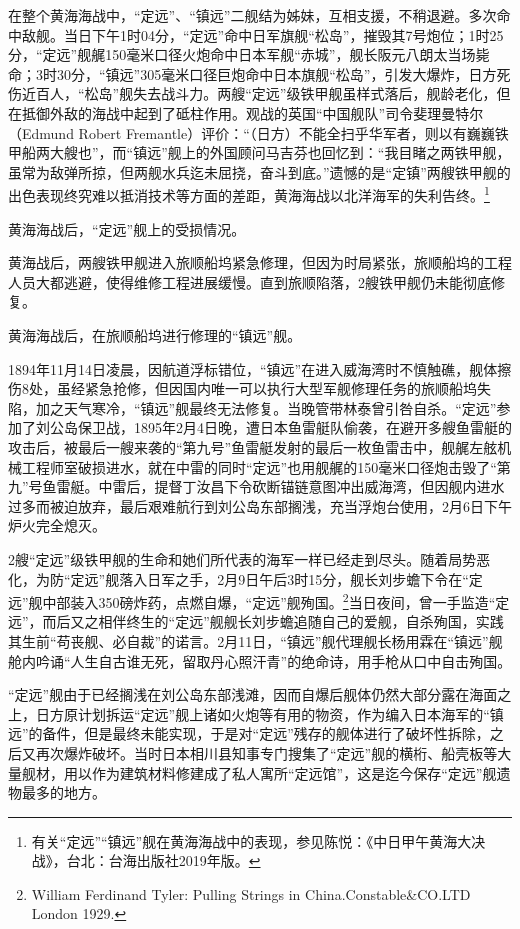 \documentclass[12pt,UTF8]{ctexbook}
\begin{document}
在整个黄海海战中，“定远”、“镇远”二舰结为姊妹，互相支援，不稍退避。多次命中敌舰。当日下午1时04分，“定远”命中日军旗舰“松岛”，摧毁其7号炮位；1时25分，“定远”舰艉150毫米口径火炮命中日本军舰“赤城”，舰长阪元八朗太当场毙命；3时30分，“镇远”305毫米口径巨炮命中日本旗舰“松岛”，引发大爆炸，日方死伤近百人，“松岛”舰失去战斗力。两艘“定远”级铁甲舰虽样式落后，舰龄老化，但在抵御外敌的海战中起到了砥柱作用。观战的英国“中国舰队”司令斐理曼特尔（Edmund Robert Fremantle）评价：“（日方）不能全扫乎华军者，则以有巍巍铁甲船两大艘也”，而“镇远”舰上的外国顾问马吉芬也回忆到：“我目睹之两铁甲舰，虽常为敌弹所掠，但两舰水兵迄未屈挠，奋斗到底。”遗憾的是“定镇”两艘铁甲舰的出色表现终究难以抵消技术等方面的差距，黄海海战以北洋海军的失利告终。\footnote{有关“定远”“镇远”舰在黄海海战中的表现，参见陈悦：《中日甲午黄海大决战》，台北：台海出版社2019年版。}

黄海海战后，“定远”舰上的受损情况。

黄海战后，两艘铁甲舰进入旅顺船坞紧急修理，但因为时局紧张，旅顺船坞的工程人员大都逃避，使得维修工程进展缓慢。直到旅顺陷落，2艘铁甲舰仍未能彻底修复。

黄海海战后，在旅顺船坞进行修理的“镇远”舰。

1894年11月14日凌晨，因航道浮标错位，“镇远”在进入威海湾时不慎触礁，舰体擦伤8处，虽经紧急抢修，但因国内唯一可以执行大型军舰修理任务的旅顺船坞失陷，加之天气寒冷，“镇远”舰最终无法修复。当晚管带林泰曾引咎自杀。“定远”参加了刘公岛保卫战，1895年2月4日晚，遭日本鱼雷艇队偷袭，在避开多艘鱼雷艇的攻击后，被最后一艘来袭的“第九号”鱼雷艇发射的最后一枚鱼雷击中，舰艉左舷机械工程师室破损进水，就在中雷的同时“定远”也用舰艉的150毫米口径炮击毁了“第九”号鱼雷艇。中雷后，提督丁汝昌下令砍断锚链意图冲出威海湾，但因舰内进水过多而被迫放弃，最后艰难航行到刘公岛东部搁浅，充当浮炮台使用，2月6日下午炉火完全熄灭。

2艘“定远”级铁甲舰的生命和她们所代表的海军一样已经走到尽头。随着局势恶化，为防“定远”舰落入日军之手，2月9日午后3时15分，舰长刘步蟾下令在“定远”舰中部装入350磅炸药，点燃自爆，“定远”舰殉国。\footnote{William Ferdinand Tyler: Pulling Strings in China.Constable\&CO.LTD London 1929.}当日夜间，曾一手监造“定远”，而后又之相伴终生的“定远”舰舰长刘步蟾追随自己的爱舰，自杀殉国，实践其生前“苟丧舰、必自裁”的诺言。2月11日，“镇远”舰代理舰长杨用霖在“镇远”舰舱内吟诵“人生自古谁无死，留取丹心照汗青”的绝命诗，用手枪从口中自击殉国。

“定远”舰由于已经搁浅在刘公岛东部浅滩，因而自爆后舰体仍然大部分露在海面之上，日方原计划拆运“定远”舰上诸如火炮等有用的物资，作为编入日本海军的“镇远”的备件，但是最终未能实现，于是对“定远”残存的舰体进行了破坏性拆除，之后又再次爆炸破坏。当时日本相川县知事专门搜集了“定远”舰的横桁、船壳板等大量舰材，用以作为建筑材料修建成了私人寓所“定远馆”，这是迄今保存“定远”舰遗物最多的地方。
\end{document}
